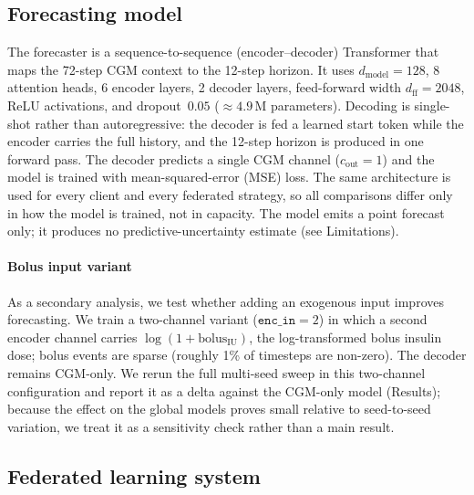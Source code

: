 \documentclass[10pt,letterpaper]{article}
\begin{document}
\subsection*{Forecasting model}

The forecaster is a sequence-to-sequence (encoder--decoder) Transformer that maps
the 72-step CGM context to the 12-step horizon. It uses
$d_{\text{model}}=128$, 8 attention heads, 6 encoder layers, 2 decoder layers,
feed-forward width $d_{\text{ff}}=2048$, ReLU activations, and dropout~$0.05$
($\approx 4.9$\,M parameters). Decoding is single-shot rather than
autoregressive: the decoder is fed a learned start token while the encoder
carries the full history, and the 12-step horizon is produced in one forward
pass. The decoder predicts a single CGM channel ($c_{\text{out}}=1$) and the
model is trained with mean-squared-error (MSE) loss. The same architecture is
used for every client and every federated strategy, so all comparisons differ
only in how the model is trained, not in capacity. The model emits a point
forecast only; it produces no predictive-uncertainty estimate (see Limitations).

\paragraph{Bolus input variant}
As a secondary analysis, we test whether adding an exogenous input improves
forecasting. We train a two-channel variant ($\texttt{enc\_in}=2$) in which a
second encoder channel carries $\log(1+\mathrm{bolus}_{\mathrm{IU}})$, the
log-transformed bolus insulin dose; bolus events are sparse (roughly 1\% of
timesteps are non-zero). The decoder remains CGM-only. We rerun the full
multi-seed sweep in this two-channel configuration and report it as a delta
against the CGM-only model (Results); because the effect on the global models
proves small relative to seed-to-seed variation, we treat it as a sensitivity
check rather than a main result.

\subsection*{Federated learning system}
\end{document}
